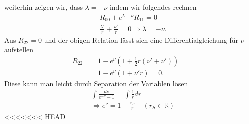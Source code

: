 \documentclass[a4paper]{article}
\begin{document}
weiterhin zeigen wir, dass $\lambda = -\nu$ indem wir folgendes rechnen
\begin{align}
    &R_{00} + e^{\lambda-\nu} R_11 = 0\\
    &\frac{\lambda'}{r} + \frac{\nu'}{r} = 0 \Rightarrow \lambda = -\nu.
\end{align}
Aus $R_{22} = 0$ und der obigen Relation lässt sich eine
Differentialgleichung für $\nu$ aufstellen
\begin{align}
    R_{22} &= 1 - e^\nu (1 + \frac{1}{2}r(\nu'+ \nu')) = \\
    &= 1 - e^\nu (1+ \nu' r) = 0.
\end{align}
Diese kann man leicht durch Separation der Variablen lösen
\begin{align}
    &\int \frac{d\nu}{e^{-\nu} -1} = \int \frac{1}{r} dr\\
    &\Rightarrow e^\nu = 1-\frac{r_S}{r} \;\;\;\; (r_S\in \mathbb{R})
\end{align}
<<<<<<< HEAD
\end{document}
